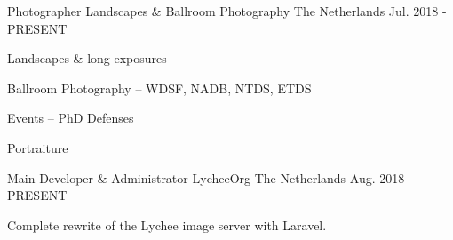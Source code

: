\begin{cventries}
	\cventry
	{Photographer} %
	{Landscapes \& Ballroom Photography} %
	{The Netherlands} %
	{Jul. 2018 - PRESENT} %
	{
		\begin{cvitems}
			\item Landscapes \& long exposures
			\item Ballroom Photography -- WDSF, NADB, NTDS, ETDS
			\item Events -- PhD Defenses
			\item Portraiture
		\end{cvitems}
	}
	\cventry
	{Main Developer \& Administrator} %
	{LycheeOrg} %
	{The Netherlands} %
	{Aug. 2018 - PRESENT} %
	{
		\begin{cvitems} %
			\item {Complete rewrite of the Lychee image server with Laravel.}
		\end{cvitems}
	}

\end{cventries}
